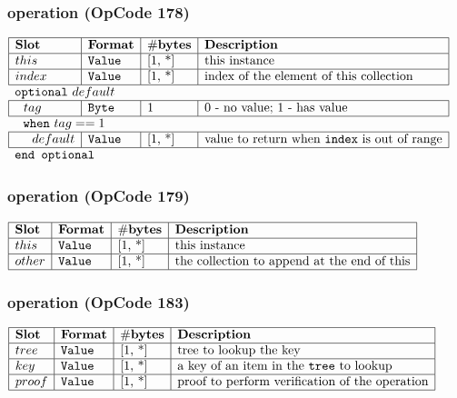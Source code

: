 \subsubsection{ operation (OpCode 178)}

\noindent
\(\begin{array}{| l | l | l | l |}
    \hline
    \bf{Slot} & \bf{Format} & \bf{\#bytes} & \bf{Description} \\
    \hline
         this & \lst{Value} & \text{[1, *]} & \text{this instance} \\
    \hline
           index & \lst{Value} & \text{[1, *]} & \text{index of the element of this collection} \\
    \hline
          \multicolumn{4}{l}{\lst{optional}~default} \\
    \hline
    ~~tag & \lst{Byte} & 1 & \text{0 - no value; 1 - has value} \\
    \hline
    \multicolumn{4}{l}{~~\lst{when}~tag == 1} \\
    \hline
             ~~~~ default & \lst{Value} & \text{[1, *]} & \text{value to return when \lst{index} is out of range} \\
    \hline
          \multicolumn{4}{l}{\lst{end optional}} \\
\end{array}\)
       

\subsubsection{ operation (OpCode 179)}

\noindent
\(\begin{array}{| l | l | l | l |}
    \hline
    \bf{Slot} & \bf{Format} & \bf{\#bytes} & \bf{Description} \\
    \hline
         this & \lst{Value} & \text{[1, *]} & \text{this instance} \\
    \hline
           other & \lst{Value} & \text{[1, *]} & \text{the collection to append at the end of this} \\
    \hline
      
\end{array}\)
       

\subsubsection{ operation (OpCode 183)}

\noindent
\(\begin{array}{| l | l | l | l |}
    \hline
    \bf{Slot} & \bf{Format} & \bf{\#bytes} & \bf{Description} \\
    \hline
         tree & \lst{Value} & \text{[1, *]} & \text{tree to lookup the key} \\
    \hline
           key & \lst{Value} & \text{[1, *]} & \text{a key of an item in the \lst{tree} to lookup} \\
    \hline
           proof & \lst{Value} & \text{[1, *]} & \text{proof to perform verification of the operation} \\
    \hline
      
\end{array}\)
       

